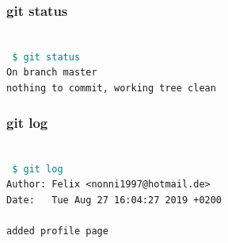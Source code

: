 \documentclass[aspectratio=169]{beamer}
\newcommand{\shellcmd}[1]{~\\ \indent\indent\texttt{\textcolor{teal}{ \$ #1}\\}}
\begin{document}

\begin{frame}
\frametitle{git status}
\shellcmd{git status}
\texttt{On branch master\\
	nothing to commit, working tree clean
}
\end{frame}


\begin{frame}
\frametitle{git log}
\shellcmd{git log}
\texttt{Author: Felix <nonni1997@hotmail.de>\\
	Date:~~ Tue Aug 27 16:04:27 2019 +0200\\
	~\\
	\hspace{1cm}added profile page	
}
\end{frame}

\end{document}

